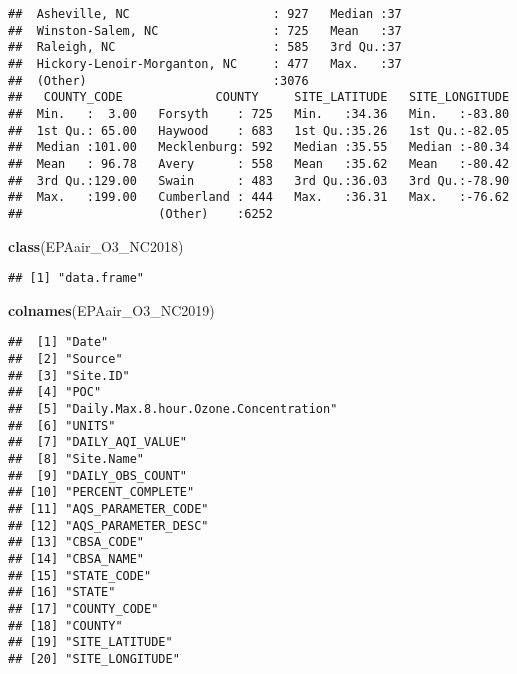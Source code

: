 \documentclass[]{article}
\newenvironment{Shaded}{\begin{snugshade}}{\end{snugshade}}
\newcommand{\KeywordTok}[1]{\textcolor[rgb]{0.13,0.29,0.53}{\textbf{#1}}}
\newcommand{\NormalTok}[1]{#1}
\begin{document}
\begin{verbatim}
##  Asheville, NC                    : 927   Median :37                        
##  Winston-Salem, NC                : 725   Mean   :37                        
##  Raleigh, NC                      : 585   3rd Qu.:37                        
##  Hickory-Lenoir-Morganton, NC     : 477   Max.   :37                        
##  (Other)                          :3076                                     
##   COUNTY_CODE             COUNTY     SITE_LATITUDE   SITE_LONGITUDE  
##  Min.   :  3.00   Forsyth    : 725   Min.   :34.36   Min.   :-83.80  
##  1st Qu.: 65.00   Haywood    : 683   1st Qu.:35.26   1st Qu.:-82.05  
##  Median :101.00   Mecklenburg: 592   Median :35.55   Median :-80.34  
##  Mean   : 96.78   Avery      : 558   Mean   :35.62   Mean   :-80.42  
##  3rd Qu.:129.00   Swain      : 483   3rd Qu.:36.03   3rd Qu.:-78.90  
##  Max.   :199.00   Cumberland : 444   Max.   :36.31   Max.   :-76.62  
##                   (Other)    :6252
\end{verbatim}

\begin{Shaded}
\begin{Highlighting}[]
\KeywordTok{class}\NormalTok{(EPAair_O3_NC2018)}
\end{Highlighting}
\end{Shaded}

\begin{verbatim}
## [1] "data.frame"
\end{verbatim}

\begin{Shaded}
\begin{Highlighting}[]
\KeywordTok{colnames}\NormalTok{(EPAair_O3_NC2019)}
\end{Highlighting}
\end{Shaded}

\begin{verbatim}
##  [1] "Date"                                
##  [2] "Source"                              
##  [3] "Site.ID"                             
##  [4] "POC"                                 
##  [5] "Daily.Max.8.hour.Ozone.Concentration"
##  [6] "UNITS"                               
##  [7] "DAILY_AQI_VALUE"                     
##  [8] "Site.Name"                           
##  [9] "DAILY_OBS_COUNT"                     
## [10] "PERCENT_COMPLETE"                    
## [11] "AQS_PARAMETER_CODE"                  
## [12] "AQS_PARAMETER_DESC"                  
## [13] "CBSA_CODE"                           
## [14] "CBSA_NAME"                           
## [15] "STATE_CODE"                          
## [16] "STATE"                               
## [17] "COUNTY_CODE"                         
## [18] "COUNTY"                              
## [19] "SITE_LATITUDE"                       
## [20] "SITE_LONGITUDE"
\end{verbatim}
\end{document}
